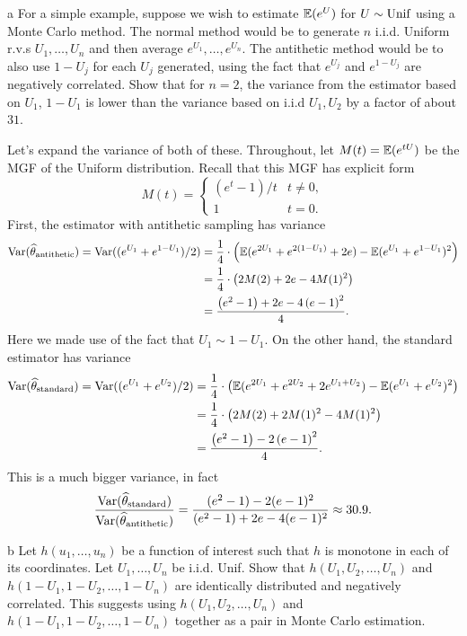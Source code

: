 \documentclass{pset}
\begin{document}
\begin{parts}
  \begin{part}{a}
    For a simple example, suppose we wish to estimate $\mathbb{E}(e^U)$ for $U\sim \textrm{Unif}$ using a Monte Carlo method. The normal method would be to generate $n$ i.i.d. Uniform r.v.s $U_1,\ldots, U_n$ and then average $e^{U_1},\ldots, e^{U_n}$. The antithetic method would be to also use $1-U_j$ for each $U_j$ generated, using the fact that $e^{U_j}$ and $e^{1-U_j}$ are negatively correlated. Show that for $n=2$, the variance from the estimator based on $U_1$, $1-U_1$ is lower than the variance based on i.i.d $U_1, U_2$ by a factor of about $31$.
  \end{part}

  Let's expand the variance of both of these. Throughout, let $M(t)=\mathbb{E}(e^{tU})$ be the MGF of the Uniform distribution. Recall that this MGF has explicit form
  \[
    M(t) = \begin{cases}(e^t-1)/t & t\neq 0,\\ 1&t=0.\end{cases}
  \]
  First, the estimator with antithetic sampling has variance
  \[
    \begin{aligned}
      \textrm{Var}(\widehat{\theta}_\textrm{antithetic})=\textrm{Var}((e^{U_1} + e^{1-U_1})/2) &= \frac{1}{4}\cdot \left(\mathbb{E}(e^{2U_1}+e^{2(1-U_1)}+2e) - \mathbb{E}(e^{U_1}+e^{1-U_1})^2\right) \\ &=\frac{1}{4}\cdot \left(2M(2)+2e -4M(1)^2\right)\\ &= \frac{\left(e^{2}-1\right)+2e-4\left(e-1\right)^{2}}{4}.
    \end{aligned}
  \]
  Here we made use of the fact that $U_1\sim 1-U_1$. On the other hand, the standard estimator has variance
  \[
    \begin{aligned}
      \textrm{Var}(\widehat{\theta}_\textrm{standard})=\textrm{Var}((e^{U_1}+e^{U_2})/2) &= \frac{1}{4}\cdot \left(\mathbb{E}(e^{2U_1}+e^{2U_2}+2e^{U_1+U_2})- \mathbb{E}(e^{U_1}+e^{U_2})^2\right)\\
                                &=\frac{1}{4}\cdot \left(2M(2)+2M(1)^2-4M(1)^2\right)\\
                                &=\frac{\left(e^{2}-1\right)-2\left(e-1\right)^{2}}{4}.
    \end{aligned}
  \]
  This is a much bigger variance, in fact
  \[
    \frac{\textrm{Var}(\widehat{\theta}_\textrm{standard})}{\textrm{Var}(\widehat{\theta}_\textrm{antithetic})} = \frac{(e^2-1)-2(e-1)^2}{(e^2-1)+2e-4(e-1)^2}\approx 30.9.
  \]

  \begin{part}{b}
    Let $h(u_1,\ldots, u_n)$ be a function of interest such that $h$ is monotone in each of its coordinates. Let $U_1,\ldots, U_n$ be i.i.d. Unif. Show that $h(U_1,U_2,\ldots, U_n)$ and $h(1-U_1,1-U_2, \ldots, 1-U_n)$ are identically distributed and negatively correlated. This suggests using $h(U_1, U_2,\ldots, U_n)$ and $h(1-U_1, 1-U_2, \ldots, 1-U_n)$ together as a pair in Monte Carlo estimation.
  \end{part}


\end{parts}
\end{document}
